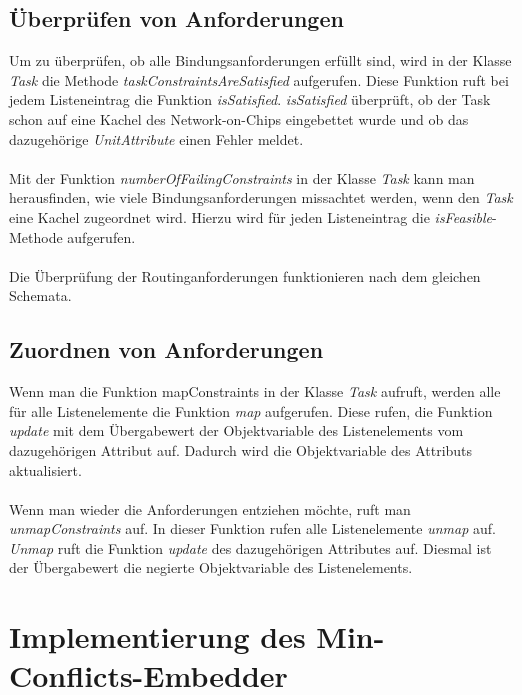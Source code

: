 \subsection{Überprüfen von Anforderungen}
Um zu überprüfen, ob alle Bindungsanforderungen erfüllt sind, wird in der Klasse \textit{Task} die Methode \textit{taskConstraintsAreSatisfied} aufgerufen. Diese Funktion ruft bei jedem Listeneintrag die Funktion \textit{isSatisfied}. \textit{isSatisfied} überprüft, ob der Task schon auf eine Kachel des Network-on-Chips eingebettet wurde und ob das dazugehörige \textit{UnitAttribute} einen Fehler meldet.\\
\\
Mit der Funktion \textit{numberOfFailingConstraints} in der Klasse \textit{Task} kann man herausfinden, wie viele Bindungsanforderungen missachtet werden, wenn den \textit{Task} eine Kachel zugeordnet wird. Hierzu wird für jeden Listeneintrag die \textit{isFeasible}-Methode aufgerufen.\\
\\
Die Überprüfung der Routinganforderungen funktionieren nach dem gleichen Schemata.

\subsection{Zuordnen  von Anforderungen}
Wenn man die Funktion mapConstraints in der Klasse \textit{Task} aufruft, werden alle für alle Listenelemente die Funktion \textit{map} aufgerufen. Diese rufen, die Funktion \textit{update} mit dem Übergabewert der Objektvariable des Listenelements vom dazugehörigen Attribut auf. Dadurch wird die Objektvariable des Attributs aktualisiert.\\
\\
Wenn man wieder die Anforderungen entziehen möchte, ruft man \textit{unmapConstraints} auf. In dieser Funktion rufen alle Listenelemente \textit{unmap} auf. \textit{Unmap} ruft die Funktion \textit{update} des dazugehörigen Attributes auf. Diesmal ist der Übergabewert die negierte Objektvariable des Listenelements.



\section{Implementierung des Min-Conflicts-Embedder}\label{minConflictImpl}

